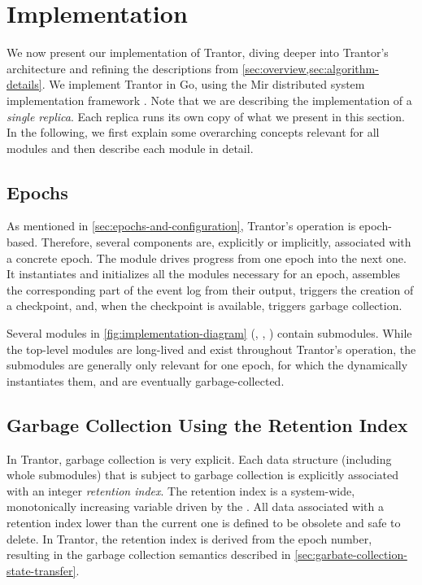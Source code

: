\documentclass{article}
\begin{document}
\section{Implementation}
\label{sec:implementation}

We now present our implementation of Trantor, diving deeper into Trantor's architecture and refining the descriptions from \cref{sec:overview,sec:algorithm-details}.
We implement Trantor in Go, using the Mir distributed system implementation framework \cite{mir}.
Note that we are describing the implementation of a \emph{single replica}.
Each replica runs its own copy of what we present in this section.
In the following, we first explain some overarching concepts relevant for all modules and then describe each module in detail.

\subsection{Epochs}

As mentioned in \cref{sec:epochs-and-configuration}, Trantor's operation is epoch-based.
Therefore, several components are, explicitly or implicitly, associated with a concrete epoch.
The  module drives progress from one epoch into the next one.
It instantiates and initializes all the modules necessary for an epoch, assembles the corresponding part of the event log from their output,
triggers the creation of a checkpoint, and, when the checkpoint is available, triggers garbage collection.

Several modules in \cref{fig:implementation-diagram} (, , ) contain submodules.
While the top-level modules are long-lived and exist throughout Trantor's operation,
the submodules are generally only relevant for one epoch, for which the  dynamically instantiates them, and are eventually garbage-collected.

\subsection{Garbage Collection Using the Retention Index}

In Trantor, garbage collection is very explicit.
Each data structure (including whole submodules) that is subject to garbage collection is explicitly associated with an integer \emph{retention index}.
The retention index is a system-wide, monotonically increasing variable driven by the .
All data associated with a retention index lower than the current one is defined to be obsolete and safe to delete.
In Trantor, the retention index is derived from the epoch number,
resulting in the garbage collection semantics described in \cref{sec:garbate-collection-state-transfer}.
\end{document}

